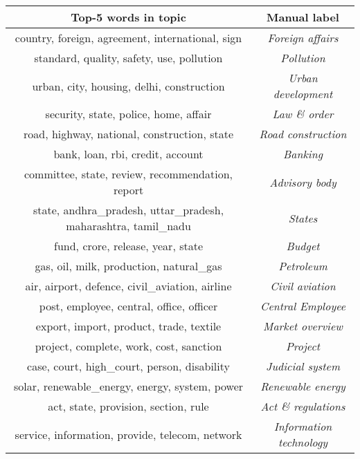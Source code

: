 \documentclass[10pt, a4paper]{article}
\begin{document}
\begin{table}[!htbp]
\centering
\begin{adjustbox}{width=0.99\linewidth}
  \begin{tabular}{|c|c|} \hline 
    \textbf{Top-5 words in topic} & \textbf{Manual label} \\ \hline
        country, foreign, agreement, international, sign & \textit{Foreign affairs} \\ \hline
        standard, quality, safety, use, pollution & \textit{Pollution} \\ \hline
        urban, city, housing, delhi, construction & \textit{Urban development} \\ \hline
        security, state, police, home, affair & \textit{Law \& order} \\ \hline
        road, highway, national, construction, state & \textit{Road construction} \\ \hline
        bank, loan, rbi, credit, account & \textit{Banking} \\ \hline
        committee, state, review, recommendation, report & \textit{Advisory body} \\ \hline
        state, andhra\_pradesh, uttar\_pradesh, maharashtra, tamil\_nadu & \textit{States} \\ \hline
        fund, crore, release, year, state & \textit{Budget} \\ \hline
        gas, oil, milk, production, natural\_gas & \textit{Petroleum} \\ \hline
        air, airport, defence, civil\_aviation, airline & \textit{Civil aviation} \\ \hline
        post, employee, central, office, officer & \textit{Central Employee} \\ \hline
        export, import, product, trade, textile & \textit{Market overview} \\ \hline
        project, complete, work, cost, sanction & \textit{Project} \\ \hline
        case, court, high\_court, person, disability & \textit{Judicial system} \\ \hline
        solar, renewable\_energy, energy, system, power & \textit{Renewable energy} \\ \hline
        act, state, provision, section, rule & \textit{Act \& regulations} \\ \hline
        service, information, provide, telecom, network & \textit{Information technology} \\ \hline

\end{tabular}
\end{adjustbox}
\end{table}
\end{document}
